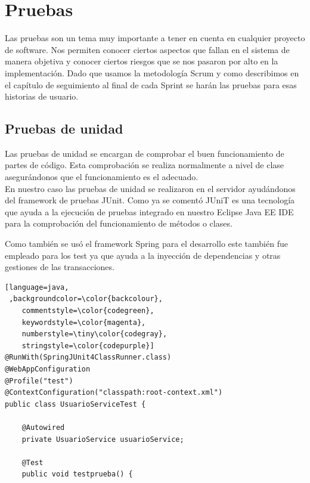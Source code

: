 	
\newpage
	
\section{Pruebas}
Las pruebas son un tema muy importante a tener en cuenta en cualquier proyecto de software. Nos permiten conocer ciertos aspectos que fallan en el sistema de manera objetiva y conocer ciertos riesgos que se nos pasaron por alto en la implementación.
Dado que usamos la metodología Scrum y como describimos en el capítulo de seguimiento al final de cada Sprint se harán las pruebas para esas historias de usuario.



\subsection{Pruebas de unidad}
Las pruebas de unidad se  encargan de comprobar el  buen funcionamiento de partes de código. Esta comprobación se realiza normalmente a nivel de clase  asegurándonos que el funcionamiento es el adecuado.\\En nuestro caso las pruebas de unidad se realizaron en el servidor ayudándonos del framework de pruebas JUnit. Como ya se comentó JUniT es una tecnología que ayuda a la ejecución de pruebas integrado en nuestro Eclipse Java EE IDE para la comprobación del funcionamiento de métodos o clases.

Como también se usó el framework Spring para el desarrollo este también fue empleado para los test ya que ayuda a la inyección de dependencias y otras gestiones de las transacciones.



\begin{lstlisting}[language=java,
 ,backgroundcolor=\color{backcolour},   
    commentstyle=\color{codegreen},
    keywordstyle=\color{magenta},
    numberstyle=\tiny\color{codegray},
    stringstyle=\color{codepurple}]
@RunWith(SpringJUnit4ClassRunner.class)
@WebAppConfiguration
@Profile("test")
@ContextConfiguration("classpath:root-context.xml")
public class UsuarioServiceTest {

	@Autowired
	private UsuarioService usuarioService;
	
	@Test
	public void testprueba() {

\end{lstlisting}







